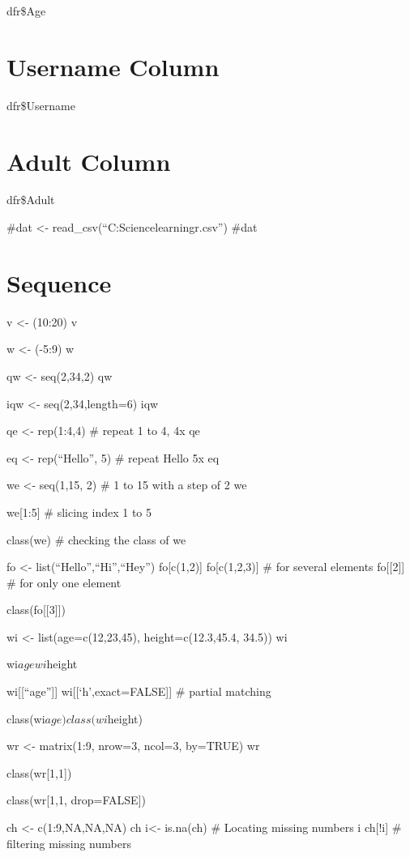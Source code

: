 \documentclass[
]{article}
\begin{document}
dfr\$Age

\section{Username Column}\label{username-column}

dfr\$Username

\section{Adult Column}\label{adult-column}

dfr\$Adult

\#dat \textless-
read\_csv(``C:\Users\HP\Desktop\Data Science\Machine learning\Training r.csv'')
\#dat

\section{Sequence}\label{sequence}

v \textless- (10:20) v

w \textless- (-5:9) w

qw \textless- seq(2,34,2) qw

iqw \textless- seq(2,34,length=6) iqw

qe \textless- rep(1:4,4) \# repeat 1 to 4, 4x qe

eq \textless- rep(``Hello'', 5) \# repeat Hello 5x eq

we \textless- seq(1,15, 2) \# 1 to 15 with a step of 2 we

we{[}1:5{]} \# slicing index 1 to 5

class(we) \# checking the class of we

fo \textless- list(``Hello'',``Hi'',``Hey'') fo{[}c(1,2){]}
fo{[}c(1,2,3){]} \# for several elements fo{[}{[}2{]}{]} \# for only one
element

class(fo{[}{[}3{]}{]})

wi \textless- list(age=c(12,23,45), height=c(12.3,45.4, 34.5)) wi

wi\(age
wi\)height

wi{[}{[}``age''{]}{]} wi{[}{[}`h',exact=FALSE{]}{]} \# partial matching

class(wi\(age)
class(wi\)height)

wr \textless- matrix(1:9, nrow=3, ncol=3, by=TRUE) wr

class(wr{[}1,1{]})

class(wr{[}1,1, drop=FALSE{]})

ch \textless- c(1:9,NA,NA,NA) ch i\textless- is.na(ch) \# Locating
missing numbers i ch{[}!i{]} \# filtering missing numbers
\end{document}
